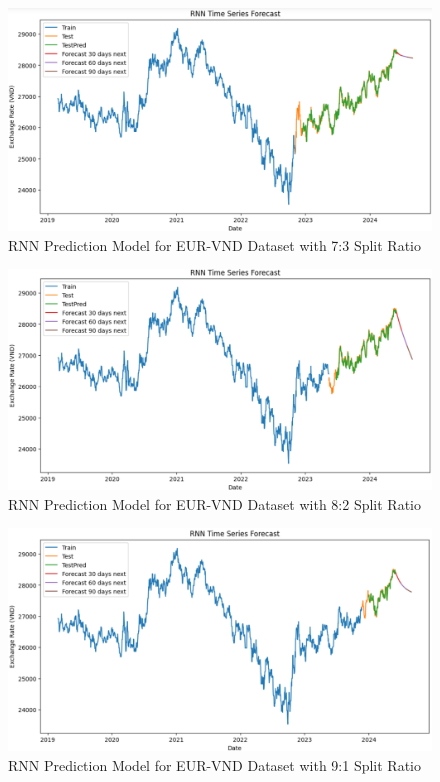 \documentclass{ieeeojies}
\begin{document}
\begin{figure}[H]
  \centering
  \begin{minipage}{0.8\linewidth}
    \centering
    \includegraphics[width=\linewidth]{RNN/rnn_eur_73.png}
    \caption{RNN Prediction Model for EUR-VND Dataset with 7:3 Split Ratio}
    \label{fig26}
  \end{minipage}
\end{figure}
\begin{figure}[H]
  \centering
  \begin{minipage}{0.8\linewidth}
    \centering
    \includegraphics[width=\linewidth]{RNN/rnn_eur_82.png}
    \caption{RNN Prediction Model for EUR-VND Dataset with 8:2 Split Ratio}
    \label{fig27}
  \end{minipage}
\end{figure}
\begin{figure}[H]
  \centering
  \begin{minipage}{0.8\linewidth}
    \centering
    \includegraphics[width=\linewidth]{RNN/rnn_eur_91.png}
    \caption{RNN Prediction Model for EUR-VND Dataset with 9:1 Split Ratio}
    \label{fig28}
  \end{minipage}
\end{figure}
\end{document}
